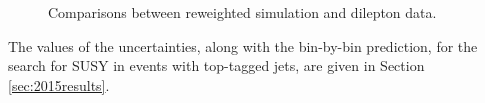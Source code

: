 \begin{figure}[tb!]
{}
\caption{Comparisons between reweighted simulation and dilepton data.}
\label{fig:zinvdatamc}
\end{figure}

The values of the uncertainties, along with the bin-by-bin prediction, for the search for SUSY in events with top-tagged jets, are given in Section \ref{sec:2015results}.

\FloatBarrier
